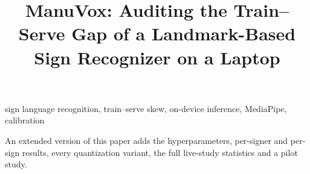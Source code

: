 \documentclass[conference]{IEEEtran}
\begin{document}

\title{ManuVox: Auditing the Train--Serve Gap of a Landmark-Based Sign Recognizer on a Laptop}

\author{
}

\maketitle



\begin{IEEEkeywords}
sign language recognition, train--serve skew, on-device inference, MediaPipe, calibration
\end{IEEEkeywords}


An extended version of this paper \cite{shukla2026manuvox} adds the hyperparameters, per-signer and
per-sign results, every quantization variant, the full live-study statistics and a pilot study.












\end{document}
